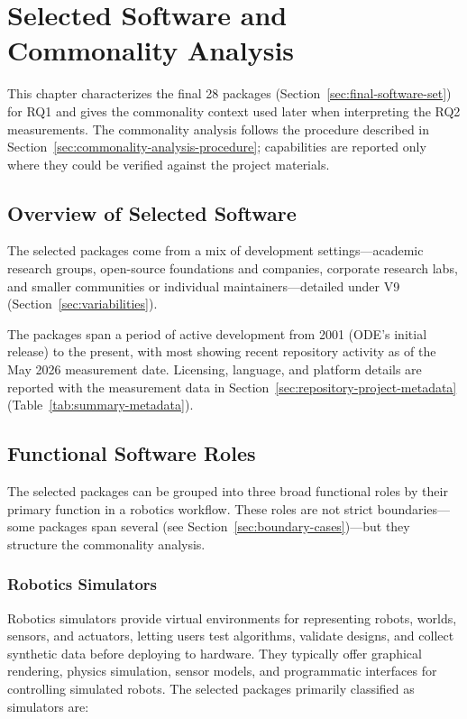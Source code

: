 \chapter{Selected Software and Commonality Analysis}
\label{ch:selected-software-commonality}

This chapter characterizes the final 28 packages (Section~\ref{sec:final-software-set}) for RQ1 and gives the commonality context used later when interpreting the RQ2 measurements. The commonality analysis follows the \citet{Weiss1998} procedure described in Section~\ref{sec:commonality-analysis-procedure}; capabilities are reported only where they could be verified against the project materials.

\section{Overview of Selected Software}
\label{sec:overview-selected-software}

The selected packages come from a mix of development settings---academic research groups, open-source foundations and companies, corporate research labs, and smaller communities or individual maintainers---detailed under V9 (Section~\ref{sec:variabilities}).

The packages span a period of active development from 2001 (ODE's initial release) to the present, with most showing recent repository activity as of the May 2026 measurement date. Licensing, language, and platform details are reported with the measurement data in Section~\ref{sec:repository-project-metadata} (Table~\ref{tab:summary-metadata}).

\section{Functional Software Roles}
\label{sec:robotics-software-categories}

The selected packages can be grouped into three broad functional roles by their primary function in a robotics workflow. These roles are not strict boundaries---some packages span several (see Section~\ref{sec:boundary-cases})---but they structure the commonality analysis.

\subsection{Robotics Simulators}
\label{subsec:robotics-simulators}

Robotics simulators provide virtual environments for representing robots, worlds, sensors, and actuators, letting users test algorithms, validate designs, and collect synthetic data before deploying to hardware. They typically offer graphical rendering, physics simulation, sensor models, and programmatic interfaces for controlling simulated robots. The selected packages primarily classified as simulators are:

